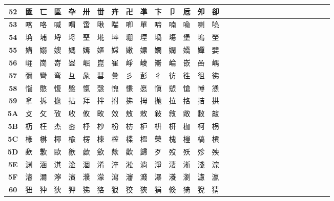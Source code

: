 \begin{table}[H]
\begin{tabular}{|Sc|Sc|Sc|Sc|Sc|Sc|Sc|Sc|Sc|Sc|Sc|Sc|Sc|Sc|Sc|}
\textbf{52} & 匳 & 匸 & 區 & 卆 & 卅 & 丗 & 卉 & 卍 & 凖 & 卞 & 卩 & 卮 & 夘 & 卻 \\ \hline
\textbf{53} & 喀 & 咯 & 喊 & 喟 & 啻 & 啾 & 喘 & 喞 & 單 & 啼 & 喃 & 喩 & 喇 & 喨 \\ \hline
\textbf{54} & 埆 & 埔 & 埒 & 埓 & 堊 & 埖 & 埣 & 堋 & 堙 & 堝 & 塲 & 堡 & 塢 & 塋 \\ \hline
\textbf{55} & 媾 & 嫋 & 嫂 & 媽 & 嫣 & 嫗 & 嫦 & 嫩 & 嫖 & 嫺 & 嫻 & 嬌 & 嬋 & 嬖 \\ \hline
\textbf{56} & 崕 & 崗 & 嵜 & 崟 & 崛 & 崑 & 崔 & 崢 & 崚 & 崙 & 崘 & 嵌 & 嵒 & 嵎 \\ \hline
\textbf{57} & 彌 & 彎 & 弯 & 彑 & 彖 & 彗 & 彙 & 彡 & 彭 & 彳 & 彷 & 徃 & 徂 & 彿 \\ \hline
\textbf{58} & 惱 & 愍 & 愎 & 慇 & 愾 & 愨 & 愧 & 慊 & 愿 & 愼 & 愬 & 愴 & 愽 & 慂 \\ \hline
\textbf{59} & 拿 & 拆 & 擔 & 拈 & 拜 & 拌 & 拊 & 拂 & 拇 & 抛 & 拉 & 挌 & 拮 & 拱 \\ \hline
\textbf{5A} & 攴 & 攵 & 攷 & 收 & 攸 & 畋 & 效 & 敖 & 敕 & 敍 & 敘 & 敞 & 敝 & 敲 \\ \hline
\textbf{5B} & 杤 & 枉 & 杰 & 枩 & 杼 & 杪 & 枌 & 枋 & 枦 & 枡 & 枅 & 枷 & 柯 & 枴 \\ \hline
\textbf{5C} & 椽 & 楙 & 椰 & 楡 & 楞 & 楝 & 榁 & 楪 & 榲 & 榮 & 槐 & 榿 & 槁 & 槓 \\ \hline
\textbf{5D} & 歃 & 歉 & 歐 & 歙 & 歔 & 歛 & 歟 & 歡 & 歸 & 歹 & 歿 & 殀 & 殄 & 殃 \\ \hline
\textbf{5E} & 渊 & 涵 & 淇 & 淦 & 涸 & 淆 & 淬 & 淞 & 淌 & 淨 & 淒 & 淅 & 淺 & 淙 \\ \hline
\textbf{5F} & 濬 & 濔 & 濘 & 濱 & 濮 & 濛 & 瀉 & 瀋 & 濺 & 瀑 & 瀁 & 瀏 & 濾 & 瀛 \\ \hline
\textbf{60} & 狃 & 狆 & 狄 & 狎 & 狒 & 狢 & 狠 & 狡 & 狹 & 狷 & 倏 & 猗 & 猊 & 猜 \\ \hline
\end{tabular}
\end{table}

